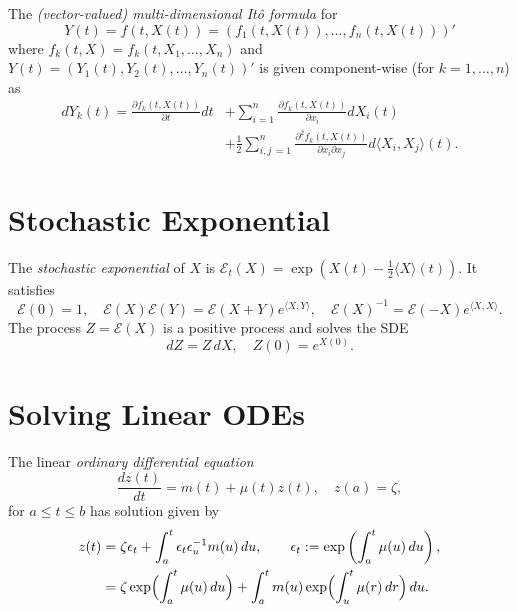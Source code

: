 \documentclass[twocolumn]{amsart}
\newcommand{\QV}[1]{\langle#1\rangle}
\newcommand{\sE}{\mathcal{E}}
\begin{document}
The \emph{(vector-valued) multi-dimensional It\^{o} formula} for
\begin{equation*}
    Y(t) = f(t,X(t)) = (f_1(t,X(t)), \ldots, f_n(t,X(t)))'
\end{equation*}
where $f_k(t, X) = f_k(t, X_1, \ldots, X_n)$ and $Y(t) = (Y_1(t), Y_2(t), \ldots, Y_n(t))'$ is given component-wise (for $k=1, \ldots, n$) as
\begin{align*}
    d Y_k(t) = \frac{\partial f_k(t,X(t))}{\partial t} dt
            &+ \sum_{i=1}^n \frac{\partial f_k(t,X(t))}{\partial x_i} dX_i(t) \\
            &+ \frac{1}{2}\sum_{i,j\,=1}^n \frac{\partial^2 f_k(t,X(t))}{\partial x_i \partial x_j} d \QV{X_i, X_j}(t).
\end{align*}

\section*{Stochastic Exponential}
The \emph{stochastic exponential} of $X$ is $\sE_t(X) = \exp({X(t) - \frac12 \QV{X}(t)})$. It satisfies
\begin{equation*}
    \sE(0) = 1, \quad \sE(X)\sE(Y) = \sE(X+Y)e^{\QV{X,Y}}, \quad \sE(X)^{-1} = \sE(-X) e^{\QV{X,X}}.
\end{equation*}
The process $Z = \sE(X)$ is a positive process and solves the SDE
\begin{equation*}
    dZ = Z\,dX, \quad Z(0) = e^{X(0)}.
\end{equation*}

\section*{Solving Linear ODEs}

The linear \emph{ordinary differential equation}
\begin{equation*}
    \frac{dz(t)}{dt} = m(t) + \mu(t)z(t), \quad z(a) = \zeta,
\end{equation*}
for $a \le t \le b$ has solution given by
\begin{equation*}
    \begin{aligned}
    z(t) &= \zeta \epsilon_t + \int_a^t \epsilon_t \epsilon_u^{-1} m(u)\,du, \qquad\epsilon_t := \exp\left(\int_a^t \mu(u)\,du\right), \\
    & = \zeta \exp\Bigl({\int_a^t \mu(u)\,du}\Bigr) + \int_a^t m(u) \exp\Bigl({\int_u^t \mu(r)\,dr}\Bigr)\,du.
    \end{aligned}
\end{equation*}
\end{document}
